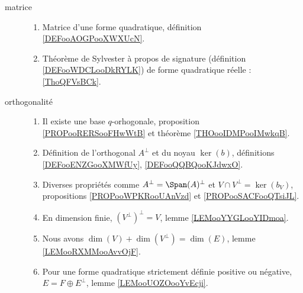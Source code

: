 \begin{description}
	\item[matrice]\hspace{1cm}
	\begin{enumerate}
		\item
		      Matrice d'une forme quadratique, définition \ref{DEFooAOGPooXWXUcN}.
		\item
		      Théorème de Sylvester à propos de signature (définition \ref{DEFooWDCLooDkRYLK}) de forme quadratique réelle : \ref{ThoQFVsBCk}.
	\end{enumerate}
	\item[orthogonalité]\hspace{1cm}
	\begin{enumerate}
		\item
		      Il existe une base \( q\)-orhogonale, proposition \ref{PROPooRERSooFHwWtB} et théorème \ref{THOooIDMPooIMwkqB}.
		\item
		      Définition de l'orthogonal \( A^{\perp}\) et du noyau \( \ker(b)\), définitions \ref{DEFooENZGooXMWfUy}, \ref{DEFooQQBQooKJdwxO}.
		\item
		      Diverses propriétés comme \( A^{\perp}=\Span(A)^{\perp}\) et \( V\cap V^{\perp}=\ker(b_V)\), propositions \ref{PROPooWPKRooUAnVzd} et \ref{PROPooSACFooQTsiJL}.
		\item
		      En dimension finie, \( (V^{\perp})^{\perp}=V\), lemme \ref{LEMooYYGLooYIDmoa}.
		\item
		      Nous avons \( \dim(V)+\dim(V^{\perp})=\dim(E)\), lemme \ref{LEMooRXMMooAvvOjF}.
		\item
		      Pour une forme quadratique strictement définie positive ou négative, \( E=F\oplus E^{\perp}\), lemme \ref{LEMooUOZOooYvEcji}.
	\end{enumerate}
\end{description}

